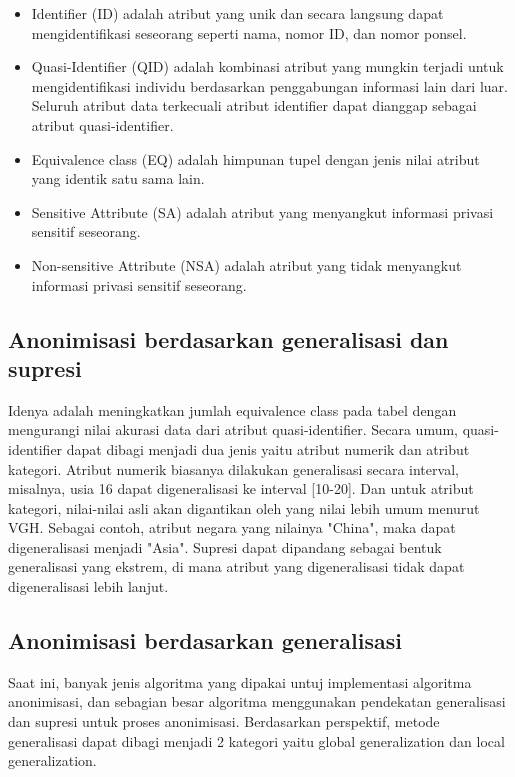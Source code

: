 \begin{itemize}
\item Identifier (ID) adalah atribut yang unik dan secara langsung dapat mengidentifikasi seseorang seperti nama, nomor ID, dan nomor ponsel.
\item Quasi-Identifier (QID) adalah kombinasi atribut yang mungkin terjadi untuk mengidentifikasi individu berdasarkan penggabungan informasi lain dari luar. Seluruh atribut data terkecuali atribut identifier dapat dianggap sebagai atribut quasi-identifier.
\item Equivalence class (EQ) adalah himpunan tupel 
dengan jenis nilai atribut yang identik satu sama lain.
\item Sensitive Attribute (SA) adalah atribut yang menyangkut informasi privasi sensitif seseorang.
\item Non-sensitive Attribute (NSA) adalah atribut yang tidak menyangkut informasi privasi sensitif seseorang.
\end{itemize}


\subsection{Anonimisasi berdasarkan generalisasi dan supresi}
Idenya adalah meningkatkan jumlah equivalence class pada tabel dengan mengurangi nilai akurasi data dari atribut quasi-identifier. Secara umum, quasi-identifier dapat dibagi menjadi dua jenis yaitu atribut numerik dan atribut kategori. Atribut numerik biasanya dilakukan generalisasi secara interval, misalnya, usia 16 dapat digeneralisasi ke interval [10-20]. Dan untuk atribut kategori, nilai-nilai  asli akan digantikan oleh yang nilai lebih umum menurut VGH. Sebagai contoh, atribut negara yang nilainya "China", maka dapat digeneralisasi menjadi "Asia". Supresi dapat dipandang sebagai bentuk generalisasi yang ekstrem, di mana atribut yang digeneralisasi tidak dapat digeneralisasi lebih lanjut.

\subsection{Anonimisasi berdasarkan generalisasi}
Saat ini, banyak jenis algoritma yang dipakai untuj implementasi algoritma anonimisasi, dan sebagian besar algoritma menggunakan pendekatan generalisasi dan supresi untuk proses anonimisasi. Berdasarkan perspektif, metode generalisasi dapat dibagi menjadi 2 kategori yaitu global generalization dan local generalization. 

